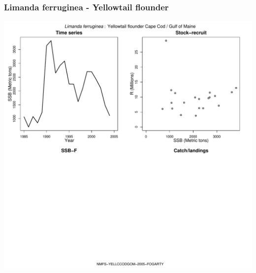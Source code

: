 \subsubsection{Limanda ferruginea - Yellowtail flounder}
\begin{center}
\includegraphics[width=1.2\textwidth]{../R/figures/NMFS-YELLCCODGOM-2005-FOGARTY.pdf}
\end{center}

